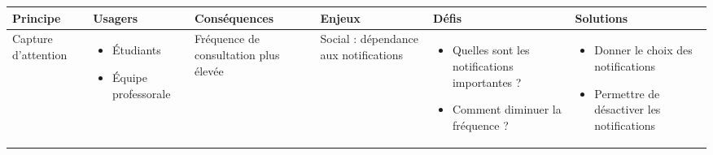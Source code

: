 \begin{tabular}{P{0.15\textwidth}P{0.15\textwidth}P{0.15\textwidth}P{0.15\textwidth}P{0.15\textwidth}P{0.15\textwidth}}
	\hline
	\bf Principe & \bf Usagers & \bf Conséquences & \bf Enjeux & \bf Défis & \bf Solutions \\
	\hline
	\hline
	Capture d'attention
	& \begin{itemize}
		\item Étudiants
		\item Équipe professorale
	\end{itemize}
	& Fréquence de consultation plus élevée
	& Social : dépendance aux notifications
	& \begin{itemize}
		\item Quelles sont les notifications importantes ?
		\item Comment diminuer la fréquence ?
	\end{itemize}
	& \begin{itemize}
		\item Donner le choix des notifications
		\item Permettre de désactiver les notifications
	\end{itemize}
	\\
	\hline
\end{tabular}